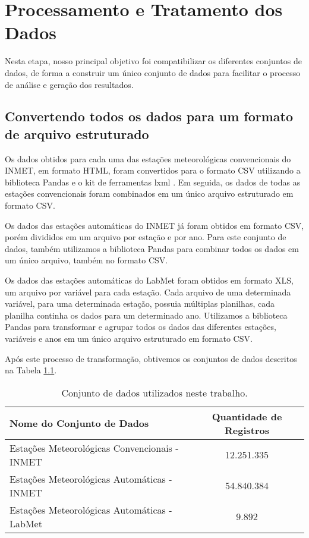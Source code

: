 \chapter{Processamento e Tratamento dos Dados}

Nesta etapa, nosso principal objetivo foi compatibilizar os diferentes conjuntos de dados, de forma a construir um único conjunto de dados para facilitar o processo de análise e geração dos resultados.

\section{Convertendo todos os dados para um formato de arquivo estruturado}

Os dados obtidos para cada uma das estações meteorológicas convencionais do INMET,  em formato HTML, foram convertidos para o formato CSV utilizando a biblioteca Pandas \cite{mckinney2011pandas} e o kit de ferramentas lxml \cite{behnel2005lxml}. Em seguida, os dados de todas as estações convencionais foram combinados em um único arquivo estruturado em formato CSV. 

Os dados das estações automáticas do INMET já foram obtidos em formato CSV, porém divididos em um arquivo por estação e por ano. Para este conjunto de dados, também utilizamos a biblioteca Pandas para combinar todos os dados em um único arquivo, também no formato CSV.

Os dados das estações automáticas do LabMet foram obtidos em formato XLS, um arquivo por variável para cada estação. Cada arquivo de uma determinada variável, para uma determinada estação, possuia múltiplas planilhas, cada planilha continha os dados para um determinado ano. Utilizamos a biblioteca Pandas para transformar e agrupar todos os dados das diferentes estações, variáveis e anos em um único arquivo estruturado em formato CSV.


Após este processo de transformação, obtivemos os conjuntos de dados descritos na Tabela \ref{tab:lista_conjunto_de_dados}.

\begin{table}[H]
\caption{Conjunto de dados utilizados neste trabalho.}
\label{tab:lista_conjunto_de_dados}
\begin{tabular}{|l|c|}
\hline
\textbf{Nome do Conjunto de Dados} & \textbf{Quantidade de Registros}\\
\hline
Estações Meteorológicas Convencionais - INMET  & 12.251.335 \\
\hline
Estações Meteorológicas Automáticas - INMET & 54.840.384 \\
\hline
Estações Meteorológicas Automáticas - LabMet & 9.892 \\
\hline
\end{tabular}
\end{table}

